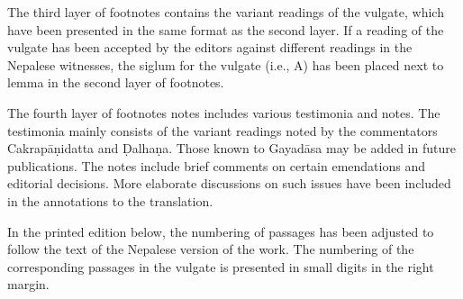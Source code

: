 The third layer of footnotes contains the variant readings of the vulgate,
which have been presented in the same format as the second layer. If a reading
of the vulgate has been accepted by the editors against different readings in
the Nepalese witnesses, the siglum for the vulgate (i.e., A) has been placed
next to lemma in the second layer of footnotes.

The fourth layer of footnotes notes includes various testimonia and notes. The
testimonia mainly consists of the variant readings noted by the commentators
Cakrapāṇidatta and Ḍalhaṇa. Those known to Gayadāsa may be added in future
publications. The notes include brief comments on certain emendations and
editorial decisions. More elaborate discussions on such issues have been included
in the annotations to the translation.

In the printed edition below, the numbering of passages has been adjusted to
follow the text of the Nepalese version of the work.  The numbering of the
corresponding passages in the vulgate is presented in small digits in the
right margin.
